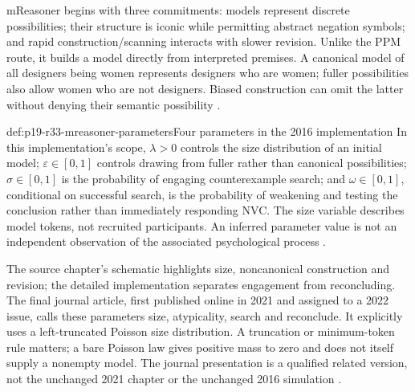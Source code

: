 mReasoner begins with three commitments: models represent discrete
possibilities; their structure is iconic while permitting abstract negation
symbols; and rapid construction/scanning interacts with slower revision.
Unlike the PPM route, it builds a model directly from interpreted premises.
A canonical model of all designers being women represents designers who
are women; fuller possibilities also allow women who are not designers.
Biased construction can omit the latter without denying their semantic
possibility \cite[pp.~231--233]{Khemlani2021Syllogistic}.

\begin{hbdefinition}{def:p19-r33-mreasoner-parameters}{Four parameters in the 2016 implementation}
In this implementation's scope, \(\lambda>0\) controls the size
distribution of an initial model; \(\varepsilon\in[0,1]\) controls
drawing from fuller rather than canonical possibilities;
\(\sigma\in[0,1]\) is the probability of engaging counterexample
search; and \(\omega\in[0,1]\), conditional on successful search,
is the probability of weakening and testing the conclusion rather than
immediately responding NVC. The size variable describes model tokens,
not recruited participants. An inferred parameter value is not an
independent observation of the associated psychological process
\cite[pp.~2--3]{KhemlaniJohnsonLaird2016IndividualSyllogisms}.
\end{hbdefinition}

The source chapter's schematic highlights size, noncanonical construction
and revision; the detailed implementation separates engagement from
reconcluding. The final journal article, first published online in 2021
and assigned to a 2022 issue, calls these parameters size, atypicality,
search and reconclude. It explicitly uses a left-truncated Poisson size
distribution. A truncation or minimum-token rule matters; a bare Poisson
law gives positive mass to zero and does not itself supply a nonempty
model. The journal presentation is a qualified related version, not the
unchanged 2021 chapter or the unchanged 2016 simulation
\cite[pp.~295--297]{KhemlaniJohnsonLaird2021OnlineProperties}.

